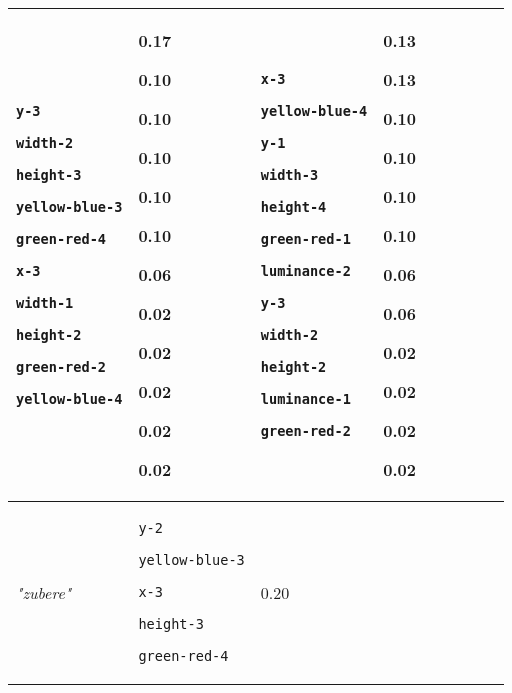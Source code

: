 {\begin{tabular}{@{}p{0.95cm}|p{1.9cm}@{}p{0.6cm}@{}|p{1.9cm}@{}p{0.6cm}@{}|p{1.9cm}@{}p{0.6cm}@{}|p{1.9cm}@{}p{0.5cm}@{}}
\texttt{y-3}

\texttt{width-2}

\texttt{height-3}

\texttt{yellow-blue-3}

\texttt{green-red-4}

\texttt{x-3}

\texttt{width-1}

\texttt{height-2}

\texttt{green-red-2}

\texttt{yellow-blue-4} & 0.17

0.10

0.10

0.10

0.10

0.10

0.06

0.02

0.02

0.02

0.02

0.02 & \texttt{x-3}

\texttt{yellow-blue-4}

\texttt{y-1}

\texttt{width-3}

\texttt{height-4}

\texttt{green-red-1}

\texttt{luminance-2}

\texttt{y-3}

\texttt{width-2}

\texttt{height-2}

\texttt{luminance-1}

\texttt{green-red-2} & 0.13

0.13

0.10

0.10

0.10

0.10

0.06

0.06

0.02

0.02

0.02

0.02\\
\hline
\textit{"zubere"} & \texttt{y-2}

\texttt{yellow-blue-3}

\texttt{x-3}

\texttt{height-3}

\texttt{green-red-4} & 0.20


\end{tabular}}
